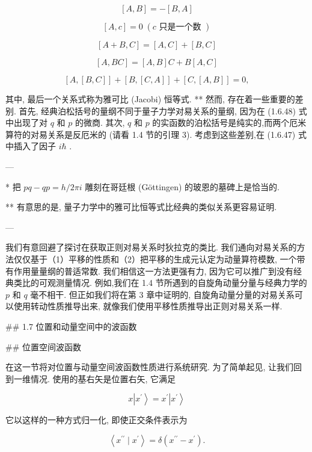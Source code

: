 \documentclass[lang=cn,newtx,10pt,scheme=chinese,thmcnt=section]{elegantbook}
\begin{document}
$$
\left\lbrack {A, B}\right\rbrack = - \left\lbrack {B, A}\right\rbrack \tag{1. 6. 50b}
$$

$$
\left\lbrack {A, c}\right\rbrack = 0\;\left( {c\text{ 只是一个数 }}\right) \tag{1.6.50c}
$$

$$
\left\lbrack {A + B, C}\right\rbrack = \left\lbrack {A, C}\right\rbrack + \left\lbrack {B, C}\right\rbrack \tag{1.6.50d}
$$

$$
\left\lbrack {A,{BC}}\right\rbrack = \left\lbrack {A, B}\right\rbrack C + B\left\lbrack {A, C}\right\rbrack \tag{1.6.50e}
$$

$$
\left\lbrack {A,\left\lbrack {B, C}\right\rbrack }\right\rbrack + \left\lbrack {B,\left\lbrack {C, A}\right\rbrack }\right\rbrack + \left\lbrack {C,\left\lbrack {A, B}\right\rbrack }\right\rbrack = 0, \tag{1.6.50f}
$$

其中, 最后一个关系式称为雅可比 (Jacobi) 恒等式. ** 然而, 存在着一些重要的差别. 首先, 经典泊松括号的量纲不同于量子力学对易关系的量纲, 因为在 (1.6.48) 式中出现了对 $q$ 和 $p$ 的微商. 其次, $q$ 和 $p$ 的实函数的泊松括号是纯实的,而两个厄米算符的对易关系是反厄米的 (请看 1.4 节的引理 3). 考虑到这些差别,在 (1.6.47) 式中插入了因子 $i\hbar$ .

---

* 把 ${pq} - {qp} = h/{2\pi i}$ 雕刻在哥廷根 (Göttingen) 的玻恩的墓碑上是恰当的.

** 有意思的是, 量子力学中的雅可比恒等式比经典的类似关系更容易证明.

---

我们有意回避了探讨在获取正则对易关系时狄拉克的类比. 我们通向对易关系的方法仅仅基于（1）平移的性质和（2）把平移的生成元认定为动量算符模数, 一个带有作用量量纲的普适常数. 我们相信这一方法更强有力, 因为它可以推广到没有经典类比的可观测量情况. 例如,我们在 1.4 节所遇到的自旋角动量分量与经典力学的 $p$ 和 $q$ 毫不相干. 但正如我们将在第 3 章中证明的, 自旋角动量分量的对易关系可以使用转动性质推导出来, 就像我们使用平移性质推导出正则对易关系一样.

## 1.7 位置和动量空间中的波函数

## 位置空间波函数

在这一节将对位置与动量空间波函数性质进行系统研究. 为了简单起见, 让我们回到一维情况. 使用的基右矢是位置右矢, 它满足

$$
x\left| {x}^{\prime }\right\rangle = {x}^{\prime }\left| {x}^{\prime }\right\rangle \tag{1.7.1}
$$

它以这样的一种方式归一化, 即使正交条件表示为

$$
\left\langle {{x}^{\prime \prime } \mid {x}^{\prime }}\right\rangle = \delta \left( {{x}^{\prime \prime } - {x}^{\prime }}\right) . \tag{1.7.2}
$$
\end{document}
